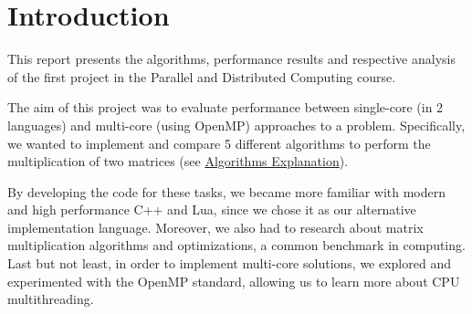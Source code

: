\section{Introduction} \label{section:introduction}

This report presents the algorithms, performance results and respective analysis of the first project in the Parallel and Distributed Computing course. 

The aim of this project was to evaluate performance between single-core (in 2 languages) and multi-core (using OpenMP) approaches to a problem. Specifically, we wanted to implement and compare 5 different algorithms to perform the multiplication of two matrices (see \hyperref[section:algorithms]{Algorithms Explanation}).

By developing the code for these tasks, we became more familiar with modern and high performance C++ and Lua, since we chose it as our alternative implementation language. Moreover, we also had to research about matrix multiplication algorithms and optimizations, a common benchmark in computing. Last but not least, in order to implement multi-core solutions, we explored and experimented with the OpenMP standard, allowing us to learn more about CPU multithreading. 
